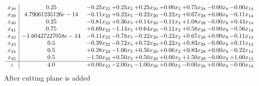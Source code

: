\documentclass[8pt]{article}
\begin{document}
\[\begin{array}{c| c c@{\hskip 2pt} c@{\hskip 2pt} c@{\hskip 2pt} c@{\hskip 2pt} c@{\hskip 2pt} c@{\hskip 2pt} c@{\hskip 2pt} }
 x_{38}   &  0.25 & -0.25 x_{22} & +  0.25 x_{5} & +  0.25 x_{20} & +  0.00 x_{2} & +  0.75 x_{28} & -0.00 x_{8} & -0.00 x_{14}\\
 x_{39}   &  4.79061235126e-14 & -0.11 x_{22} & +  0.22 x_{5} & -0.22 x_{20} & -0.22 x_{2} & +  0.67 x_{28} & +  0.00 x_{8} & -0.11 x_{14}\\
 x_{40}   &  0.25 & -0.81 x_{22} & +  0.36 x_{5} & +  0.14 x_{20} & -0.11 x_{2} & +  1.08 x_{28} & -0.00 x_{8} & +  0.44 x_{14}\\
 x_{41}   &  0.75 & +  0.69 x_{22} & -1.14 x_{5} & +  0.64 x_{20} & -0.11 x_{2} & +  0.58 x_{28} & -0.00 x_{8} & -0.56 x_{14}\\
 x_{42}   &  -1.60427227058e-14 & -0.11 x_{22} & -0.78 x_{5} & -0.22 x_{20} & -0.22 x_{2} & +  0.67 x_{28} & +  0.00 x_{8} & -0.11 x_{14}\\
 x_{43}   &  0.5 & -0.39 x_{22} & -0.72 x_{5} & +  0.72 x_{20} & +  0.22 x_{2} & +  0.83 x_{28} & -0.00 x_{8} & +  0.11 x_{14}\\
 x_{44}   &  0.5 & +  0.28 x_{22} & -1.06 x_{5} & +  0.56 x_{20} & +  0.06 x_{2} & +  0.83 x_{28} & +  0.00 x_{8} & -0.22 x_{14}\\
 x_{45}   &  0.5 & -1.50 x_{22} & +  0.50 x_{5} & +  0.50 x_{20} & +  0.00 x_{2} & +  1.50 x_{28} & -0.00 x_{8} & +  1.00 x_{14}\\
\hline
z    &  4.0 & +  0.00 x_{22} & -2.00 x_{5} & -1.00 x_{20} & +  0.00 x_{2} & -0.00 x_{28} & +  0.00 x_{8} & -0.00 x_{14}\\
\end{array}\]
 After cutting plane is added 
\end{document}
